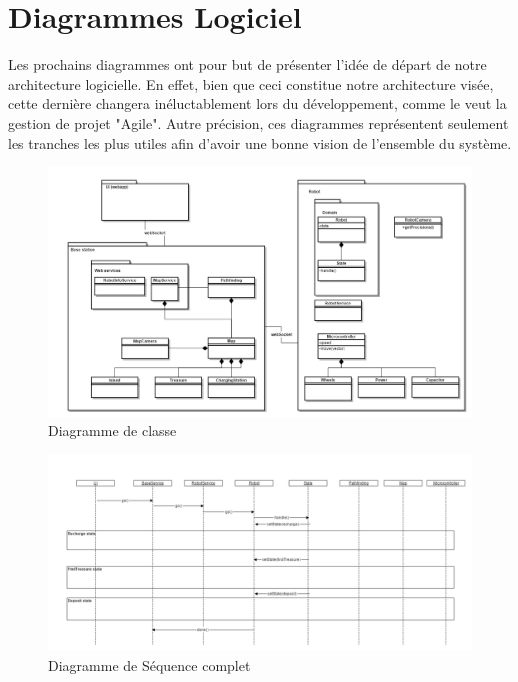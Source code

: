 \chapter{Diagrammes Logiciel}
Les prochains diagrammes ont pour but de présenter l'idée de départ de notre architecture logicielle.
En effet, bien que ceci constitue notre architecture visée, cette dernière changera inéluctablement lors du développement, comme le veut la gestion de projet "Agile".
Autre précision, ces diagrammes représentent seulement les tranches les plus utiles afin d'avoir une bonne vision de l'ensemble du système.

\begin{figure}
  \centering
  \includegraphics[scale=0.5, angle=90]{resources/diagrams/classDiagram.png}
  \caption{Diagramme de classe}
\end{figure}

\begin{figure}
  \centering
  \includegraphics[scale=0.45, angle=90]{resources/diagrams/sequenceDiagram.png}
  \caption{Diagramme de Séquence complet}
\end{figure}

